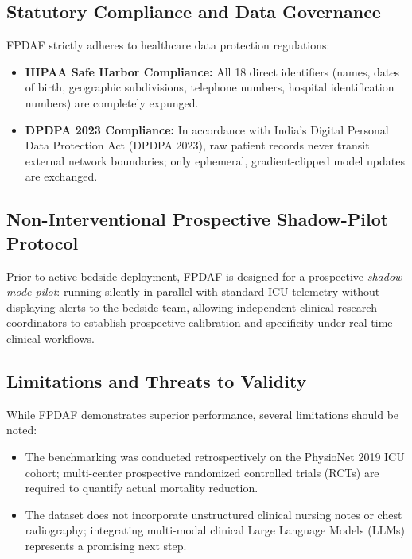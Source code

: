 \documentclass[journal,twocolumn,10pt]{IEEEtran}
\begin{document}
\subsection{Statutory Compliance and Data Governance}
FPDAF strictly adheres to healthcare data protection regulations:
\begin{itemize}
    \item \textbf{HIPAA Safe Harbor Compliance:} All 18 direct identifiers (names, dates of birth, geographic subdivisions, telephone numbers, hospital identification numbers) are completely expunged.
    \item \textbf{DPDPA 2023 Compliance:} In accordance with India's Digital Personal Data Protection Act (DPDPA 2023), raw patient records never transit external network boundaries; only ephemeral, gradient-clipped model updates are exchanged.
\end{itemize}

\subsection{Non-Interventional Prospective Shadow-Pilot Protocol}
Prior to active bedside deployment, FPDAF is designed for a prospective \textit{shadow-mode pilot}: running silently in parallel with standard ICU telemetry without displaying alerts to the bedside team, allowing independent clinical research coordinators to establish prospective calibration and specificity under real-time clinical workflows.

\subsection{Limitations and Threats to Validity}
While FPDAF demonstrates superior performance, several limitations should be noted:
\begin{itemize}
    \item The benchmarking was conducted retrospectively on the PhysioNet 2019 ICU cohort; multi-center prospective randomized controlled trials (RCTs) are required to quantify actual mortality reduction.
    \item The dataset does not incorporate unstructured clinical nursing notes or chest radiography; integrating multi-modal clinical Large Language Models (LLMs) represents a promising next step.
\end{itemize}

\end{document}
